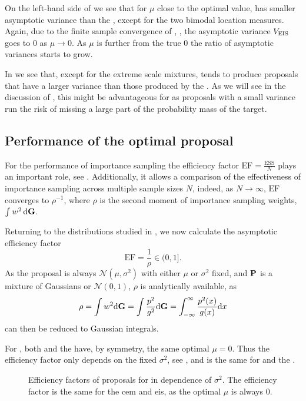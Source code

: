 On the left-hand side of  we see that for $\mu$ close to the optimal value, \aeis has smaller asymptotic variance than the \acem, except for the two bimodal location measures. Again, due to the finite sample convergence of \aeis, , the asymptotic variance $V_{\eis}$ goes to $0$ as $\mu \to 0$. As $\mu$ is further from the true $0$ the ratio of asymptotic variances starts to grow. 

In  we see that, except for the extreme scale mixtures, \aeis tends to produce proposals that have a larger variance than those produced by the \acem. As we will see in the discussion of , this might be advantageous for \aeis as proposals with a small variance run the risk of missing a large part of the probability mass of the target. 

%
\subsection{Performance of the optimal proposal}
\label{subsec:performance_at_optimal}
For the performance of importance sampling the efficiency factor $ \text{EF} = \frac{\text{ESS}}{N}$ plays an important role, see . Additionally, it allows a comparison of the effectiveness of importance sampling across multiple sample sizes $N$, indeed, as $N\to\infty$, $\text{EF}$ converges to $ \rho^{-1}$, where $\rho$ is the second moment of importance sampling weights, $\int w^{2} \d \G$.

Returning to the distributions studied in , we now calculate the asymptotic efficiency factor
$$
\text{EF} = \frac{1}{\rho} \in (0, 1].
$$
As the proposal is always $\mathcal N(\mu, \sigma^{2})$ with either $\mu$ or $\sigma^{2}$ fixed, and $\P$ is a mixture of Gaussians or $\mathcal N(0,1)$, $\rho$ is analytically available, as 
$$
    \rho = \int w^{2} \mathrm d \mathcal \G = \int \frac{p^{2}}{g^{2}} \mathrm d \mathcal \G = \int_{-\infty}^\infty \frac{p^{2}(x)}{g(x)} \mathrm d x
$$
can then be reduced to Gaussian integrals.

For , both \aeis and the \acem have, by symmetry, the same optimal $\mu = 0$. Thus the efficiency factor only depends on the fixed $\sigma^{2}$, see , and is the same for \aeis and the \acem.

\begin{figure}
    \centering
    \resizebox{\textwidth}{!}{%
    }
    \caption{Efficiency factors of proposals for  in dependence of $\sigma^{2}$. The efficiency factor is the same for the \acrshort{cem} and \acrshort{eis}, as the optimal $\mu$ is always $0$.}
    \label{fig:rho_mu}

\end{figure}

